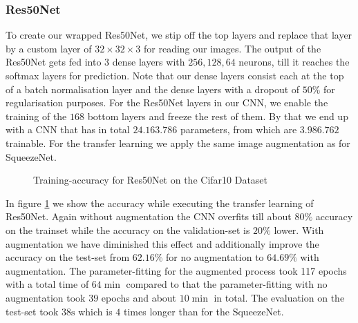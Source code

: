 \documentclass[11pt]{article}
\begin{document}
\subsubsection{Res50Net}
To create our wrapped Res50Net, we stip off the top layers and replace that layer by a custom layer of $32\times 32 \times 3$ for reading our images. The output of the Res50Net gets fed into $3$ dense layers with $256, 128, 64$ neurons, till it reaches the softmax layers for prediction. Note that our dense layers consist each at the top of a batch normalisation layer and the dense layers with a dropout of $50\%$ for regularisation purposes. For the Res50Net layers in our CNN, we enable the training of the $168$ bottom layers and freeze the rest of them. By that we end up with a CNN that has in total $24.163.786$ parameters, from which are $3.986.762$ trainable. For the transfer learning we apply the same image augmentation as for SqueezeNet.

\begin{figure}
\centering
{}
  \hfill
  \hfill
\caption{Training-accuracy for Res50Net on the Cifar10 Dataset}
\label{rescnn::3}
\end{figure}

In figure \ref{rescnn::3} we show the accuracy while executing the transfer learning of Res50Net. Again without augmentation the CNN overfits till about $80\%$ accuracy on the trainset while the accuracy on the validation-set is $20\%$ lower. With augmentation we have diminished this effect and additionally improve the accuracy on the test-set from $62.16\%$ for no augmentation to $64.69\%$ with augmentation. The parameter-fitting for the augmented process took 117 epochs with a total time of $64 \min$ compared to that the parameter-fitting with no augmentation took $39$ epochs and about $10 \min$ in total. The evaluation on the test-set took $38\text{s}$ which is  $4$ times longer than for the SqueezeNet.
\end{document}

